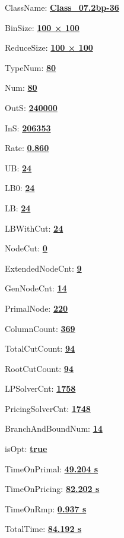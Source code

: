 \documentclass[11pt]{article}
\begin{document}
\pagestyle{empty}


ClassName: \underline{\textbf{Class_07.2bp-36}}
\par
BinSize: \underline{\textbf{100 × 100}}
\par
ReduceSize: \underline{\textbf{100 × 100}}
\par
TypeNum: \underline{\textbf{80}}
\par
Num: \underline{\textbf{80}}
\par
OutS: \underline{\textbf{240000}}
\par
InS: \underline{\textbf{206353}}
\par
Rate: \underline{\textbf{0.860}}
\par
UB: \underline{\textbf{24}}
\par
LB0: \underline{\textbf{24}}
\par
LB: \underline{\textbf{24}}
\par
LBWithCut: \underline{\textbf{24}}
\par
NodeCut: \underline{\textbf{0}}
\par
ExtendedNodeCnt: \underline{\textbf{9}}
\par
GenNodeCnt: \underline{\textbf{14}}
\par
PrimalNode: \underline{\textbf{220}}
\par
ColumnCount: \underline{\textbf{369}}
\par
TotalCutCount: \underline{\textbf{94}}
\par
RootCutCount: \underline{\textbf{94}}
\par
LPSolverCnt: \underline{\textbf{1758}}
\par
PricingSolverCnt: \underline{\textbf{1748}}
\par
BranchAndBoundNum: \underline{\textbf{14}}
\par
isOpt: \underline{\textbf{true}}
\par
TimeOnPrimal: \underline{\textbf{49.204 s}}
\par
TimeOnPricing: \underline{\textbf{82.202 s}}
\par
TimeOnRmp: \underline{\textbf{0.937 s}}
\par
TotalTime: \underline{\textbf{84.192 s}}
\par
\newpage


\end{document}
